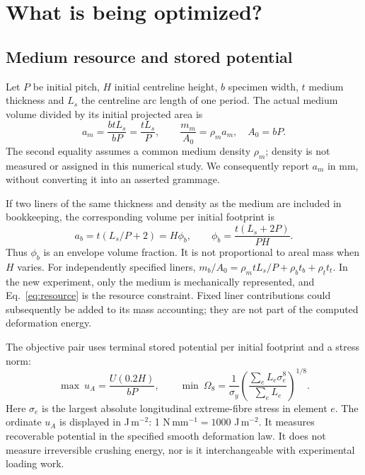 \documentclass[10pt,twocolumn]{article}
\newcommand{\ua}{u_A}
\newcommand{\am}{a_m}
\newcommand{\om}{\Omega_8}
\begin{document}
\section{What is being optimized?}
\subsection{Medium resource and stored potential}
Let $P$ be initial pitch, $H$ initial centreline height, $b$ specimen width, $t$ medium thickness and $L_s$ the centreline arc length of one period. The actual medium volume divided by its initial projected area is
\begin{equation}
 \am=\frac{btL_s}{bP}=\frac{tL_s}{P},\qquad
 \frac{m_m}{A_0}=\rho_m\am,\quad A_0=bP. \label{eq:resource}
\end{equation}
The second equality assumes a common medium density $\rho_m$; density is not measured or assigned in this numerical study. We consequently report $\am$ in mm, without converting it into an asserted grammage.

If two liners of the same thickness and density as the medium are included in bookkeeping, the corresponding volume per initial footprint is
\begin{equation}
 a_b=t(L_s/P+2)=H\phi_b,\qquad
 \phi_b=\frac{t(L_s+2P)}{PH}. \label{eq:board}
\end{equation}
Thus $\phi_b$ is an envelope volume fraction. It is not proportional to areal mass when $H$ varies. For independently specified liners, $m_b/A_0=\rho_m tL_s/P+\rho_b t_b+\rho_t t_t$. In the new experiment, only the medium is mechanically represented, and Eq.~\eqref{eq:resource} is the resource constraint. Fixed liner contributions could subsequently be added to its mass accounting; they are not part of the computed deformation energy.

The objective pair uses terminal stored potential per initial footprint and a stress norm:
\begin{equation}
 \max\ \ua=\frac{U(0.2H)}{bP},\qquad
 \min\ \om=\frac{1}{\sigma_y}
 \left(\frac{\sum_e L_e\sigma_e^8}{\sum_e L_e}\right)^{1/8}. \label{eq:objectives}
\end{equation}
Here $\sigma_e$ is the largest absolute longitudinal extreme-fibre stress in element $e$. The ordinate $\ua$ is displayed in J\,m$^{-2}$: 1 N\,mm$^{-1}=1000$ J\,m$^{-2}$. It measures recoverable potential in the specified smooth deformation law. It does not measure irreversible crushing energy, nor is it interchangeable with experimental loading work.
\end{document}

